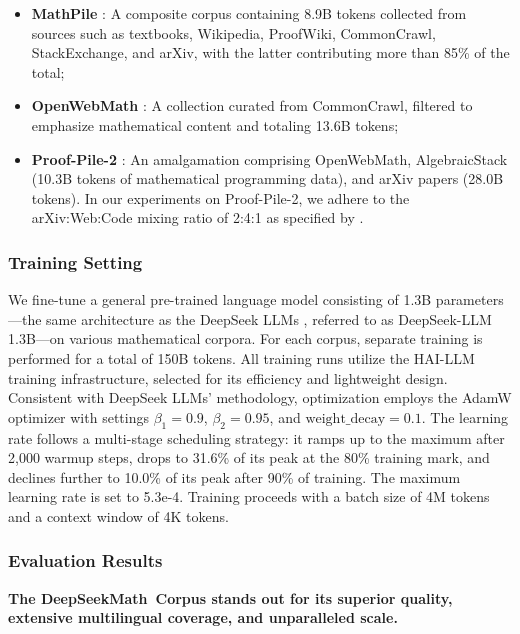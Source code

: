 \begin{itemize}[topsep=0pt]
    \item \textbf{MathPile} \citep{mathpile}: A composite corpus containing 8.9B tokens collected from sources such as textbooks, Wikipedia, ProofWiki, CommonCrawl, StackExchange, and arXiv, with the latter contributing more than 85\% of the total;
    \item \textbf{OpenWebMath} \citep{openwebmath}: A collection curated from CommonCrawl, filtered to emphasize mathematical content and totaling 13.6B tokens;
    \item \textbf{Proof-Pile-2} \citep{llemma}: An amalgamation comprising OpenWebMath, AlgebraicStack (10.3B tokens of mathematical programming data), and arXiv papers (28.0B tokens). In our experiments on Proof-Pile-2, we adhere to the arXiv:Web:Code mixing ratio of 2:4:1 as specified by \cite{llemma}.
\end{itemize}

\subsubsection{Training Setting}
\label{sec:quality-policy}
We fine-tune a general pre-trained language model consisting of 1.3B parameters—the same architecture as the DeepSeek LLMs \citep{deepseek-llm}, referred to as DeepSeek-LLM 1.3B—on various mathematical corpora. For each corpus, separate training is performed for a total of 150B tokens. All training runs utilize the HAI-LLM \citep{haillm} training infrastructure, selected for its efficiency and lightweight design. Consistent with DeepSeek LLMs' methodology, optimization employs the AdamW optimizer \citep{adamW} with settings $\beta_1=0.9$, $\beta_2=0.95$, and $\mathrm{weight\_decay}=0.1$. The learning rate follows a multi-stage scheduling strategy: it ramps up to the maximum after 2,000 warmup steps, drops to 31.6\% of its peak at the 80\% training mark, and declines further to 10.0\% of its peak after 90\% of training. The maximum learning rate is set to 5.3e-4. Training proceeds with a batch size of 4M tokens and a context window of 4K tokens.

\subsubsection{Evaluation Results}

\textbf{The DeepSeekMath~Corpus stands out for its superior quality, extensive multilingual coverage, and unparalleled scale.}

